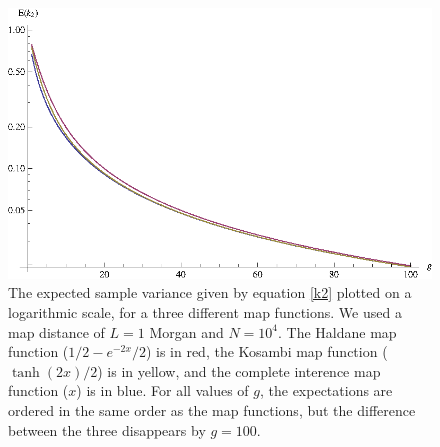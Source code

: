 \documentclass[11pt]{amsart}
\begin{document}
\newpage
\begin{figure}[htp!]
  \begin{center}
    \includegraphics[scale=1.25]{rec_comparison.eps}
    \caption{The expected sample variance given by equation \ref{k2} plotted on a logarithmic scale, for a three different map functions. We used a map distance of $L=1$ Morgan and $N=10^4$. The Haldane map function ($1/2-e^{-2x}/2$) is in red, the Kosambi map function ($\tanh(2x)/2$) is in yellow, and the complete interence map function ($x$) is in blue. For all values of $g$, the expectations are ordered in the same order as the map functions, but the difference between the three disappears by $g=100$.}
    \label{ek2_rec}
  \end{center}
\end{figure}
\end{document}
